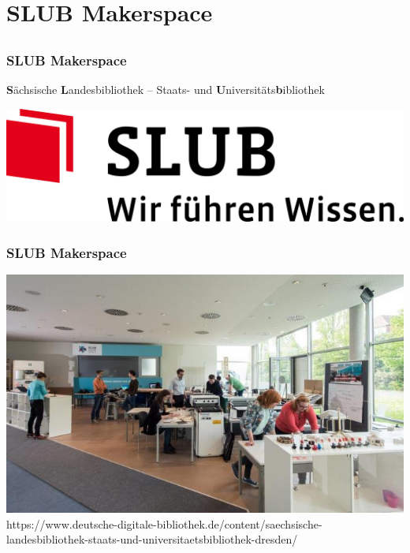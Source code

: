 \documentclass[12pt]{beamer}
\newcommand{\license}[2][]{\\#2\ifthenelse{\equal{#1}{}}{}{\\\scriptsize\url{#1}}}
\begin{document}
  \section{SLUB Makerspace}
  \subsection{}
	  
  \begin{frame}
	  \frametitle{SLUB Makerspace}
	  \begin{center}
	  \textbf{S}ächsische 
	  \textbf{L}andesbibliothek – Staats- und 
	  \textbf{U}niversitäts\textbf{b}ibliothek
	  \vspace{20pt}		

	  \includegraphics[height=0.1\textheight]{img/Logo-SLUB_Farbe.jpg}
	  \end{center}
  \end{frame}
	  
  \begin{frame}
	  \frametitle{SLUB Makerspace}
	  \begin{center}
	  \begin{minipage}{\linewidth}
		  \centering
		  \includegraphics[height=0.7\textheight]{img//slub-makerspace-deutsche-digitale-bibliothek.jpg}
		  \tiny\license{https://www.deutsche-digitale-bibliothek.de/content/saechsische-landesbibliothek-staats-und-universitaetsbibliothek-dresden/}
	  \end{minipage}		
	  \end{center}
  \end{frame}
\end{document}
